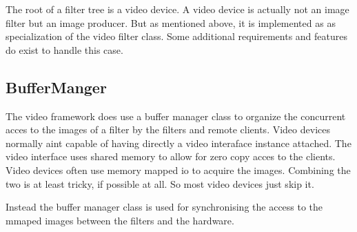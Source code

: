 The root of a filter tree is a video device. A video device is
actually not an image filter but an image producer. But as mentioned
above, it is implemented as as specialization of the video filter
class. Some additional requirements and features do exist to handle
this case.

\subsection{BufferManger}

The video framework does use a buffer manager class to organize the
concurrent acces to the images of a filter by the filters and remote
clients. Video devices normally aint capable of having directly a
video interaface instance attached. The video interface uses shared
memory to allow for zero copy acces to the clients. Video devices
often use memory mapped io to acquire the images. Combining the two is
at least tricky, if possible at all. So most video devices just skip
it.

Instead the buffer manager class is used for synchronising the access
to the mmaped images between the filters and the hardware.



